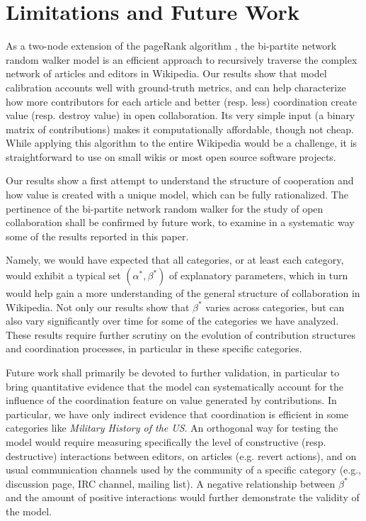 \section{Limitations and Future Work}
As a two-node extension of the pageRank algorithm \cite{page1999pagerank,kleinberg1999}, the {bi-partite network random walker} model is an efficient approach to recursively traverse the complex network of articles and editors in Wikipedia. Our results show that model calibration accounts well with ground-truth metrics, and can help characterize how more contributors for each article and better (resp. less) coordination create value (resp. destroy value) in open collaboration. Its very simple input (a binary matrix of contributions) makes it computationally affordable, though not cheap. While applying this algorithm to the entire Wikipedia would be a challenge, it is straightforward to use on small wikis or most open source software projects.

Our results show a first attempt to understand the structure of cooperation and how value is created with a unique model, which can be fully rationalized. The pertinence of the {bi-partite network random walker} for the study of open collaboration shall be confirmed by future work,  to examine in a systematic way some of the results reported in this paper.

Namely, we would have expected that all categories, or at least each category, would exhibit a typical set $(\alpha^{*},\beta^{*})$ of explanatory parameters, which in turn would help gain a more understanding of the general structure of collaboration in Wikipedia. Not only our results show that $\beta^{*}$ varies across categories, but can also vary significantly over time for some of the categories we have analyzed. These results require further scrutiny on the evolution of contribution structures and coordination processes, in particular in these specific categories. 

Future work shall primarily be devoted to further validation, in particular to bring quantitative evidence that the model can systematically account for the influence of the coordination feature on value generated by contributions. In particular, we have only indirect evidence that coordination is efficient in some categories like {\it Military History of the US}. An orthogonal way for testing the model would require measuring specifically the level of constructive (resp. destructive) interactions between editors, on articles (e.g. revert actions), and on usual communication channels used by the community of a specific category (e.g., discussion page, IRC channel, mailing list). A negative relationship between $\beta^{*}$ and the amount of positive interactions would further demonstrate the validity of the model.

